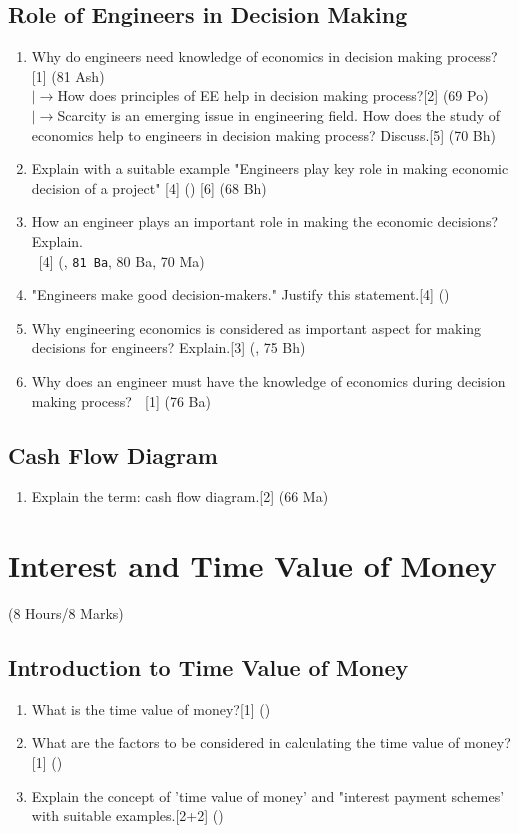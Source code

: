 \documentclass[12pt]{article}
\newcommand{\rb}{\\ $\left|\rightarrow\right.$}
\newcommand{\enter}{\\\textcolor{white}{1}}
\begin{document}
\subsection{Role of Engineers in Decision Making}
\begin{enumerate}
\item Why do engineers need knowledge of economics in decision making process?\hfill[1] (81 Ash)
\rb How does principles of EE help in decision making process?\hfill[2] (69 Po)
\rb Scarcity is an emerging issue in engineering field. How does the study of economics help to engineers in decision making process? Discuss.\hfill[5] (70 Bh)

\item Explain with a suitable example "Engineers play key role in making economic decision of a project" \hfill[4] () [6] (68 Bh)

\item How an engineer plays an important role in making the economic decisions? Explain.
\enter\hfill[4] (, \texttt{81 Ba}, 80 Ba, 70 Ma)
\item "Engineers make good decision-makers." Justify this statement.\hfill[4] ()
\item Why engineering economics is considered as important aspect for making decisions for engineers? Explain.\hfill[3] (, 75 Bh)
\item Why does an engineer must have the knowledge of economics during decision making process?
$\enter$\hfill[1] (76 Ba)
\end{enumerate}
\subsection{Cash Flow Diagram}
\begin{enumerate}
\item Explain the term: cash flow diagram.\hfill[2] (66 Ma)
\end{enumerate}

\pagebreak
\section{Interest and Time Value of Money}
\begin{center}(8 Hours/8 Marks)\end{center}
\subsection{Introduction to Time Value of Money}
\begin{enumerate}
\item What is the time value of money?\hfill[1] ()

\item What are the factors to be considered in calculating the time value of money?\hfill[1] ()

\item Explain the concept of 'time value of money' and "interest payment schemes' with suitable examples.\hspace{14.4cm}[2+2] ()
\end{enumerate}
\end{document}
